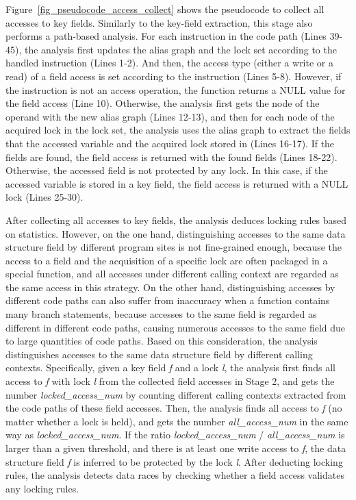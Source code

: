 Figure~\ref{fig_pseudocode_access_collect} shows the pseudocode to collect all 
accesses to key fields. Similarly to the key-field extraction, this stage also 
performs a path-based analysis. For each instruction in the code path (Lines 
39-45), the analysis first updates the alias graph and the lock set according 
to the handled instruction (Lines 1-2). And then, the access type (either a 
write or a read) of a field access is set according to the instruction (Lines 
5-8). However, if the instruction is not an access operation, the function 
returns a NULL value for the field access (Line 10). Otherwise, the analysis 
first gets the node of the operand with the new alias graph (Lines 12-13), and 
then for each node of the acquired lock in the lock set, the analysis uses the 
alias graph to extract the fields that the accessed variable and the acquired 
lock stored in (Lines 16-17). If the fields are found, the field access is 
returned with the found fields (Lines 18-22). Otherwise, the accessed field is 
not protected by any lock. In this case, if the accessed variable is stored in 
a key field, the field access is returned with a NULL lock (Lines 25-30).

 After collecting all accesses to key fields, 
the analysis deduces locking rules based on statistics. However, on the one 
hand, distinguishing accesses to the same data structure field by different 
program sites is not fine-grained enough, because the access to a field and the 
acquisition of a specific lock are often packaged in a special function, and 
all accesses under different calling context are regarded as the same access in 
this strategy. On the other hand, distinguishing accesses by different code 
paths can also suffer from inaccuracy when a function contains many branch 
statements, because accesses to the same field is regarded as different in 
different code paths, causing numerous accesses to the same field due to large 
quantities of code paths. Based on this consideration, the analysis 
distinguishes accesses to the same data structure field by different calling 
contexts. Specifically, given a key field {\em f} and a lock {\em l}, the 
analysis first finds all access to {\em f} with lock {\em l} from the collected 
field accesses in Stage 2, and gets the number {\em locked\_access\_num} by 
counting different calling contexts extracted from the code paths of these 
field accesses. Then, the analysis finds all access to {\em f} (no matter 
whether a lock is held), and gets the number {\em all\_access\_num} in the same 
way as {\em locked\_access\_num}. If the ratio {\em locked\_access\_num} / {\em 
all\_access\_num} is larger than a given threshold, and there is at least one 
write access to {\em f}, the data structure field {\em f} is inferred to be 
protected by the lock {\em l}. After deducting locking rules, the analysis 
detects data races by checking whether a field access validates any locking 
rules.

